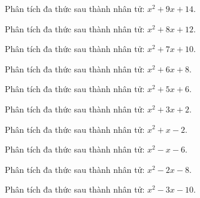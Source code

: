 \begin{bt}
	Phân tích đa thức sau thành nhân tử: $x^2 + 9 x + 14$.
\end{bt}
\begin{bt}
	Phân tích đa thức sau thành nhân tử: $x^2 + 8 x + 12$.
\end{bt}
\begin{bt}
	Phân tích đa thức sau thành nhân tử: $x^2 + 7 x + 10$.
\end{bt}
\begin{bt}
	Phân tích đa thức sau thành nhân tử: $x^2 + 6 x + 8$.
\end{bt}
\begin{bt}
	Phân tích đa thức sau thành nhân tử: $x^2 + 5 x + 6$.
\end{bt}
\begin{bt}
	Phân tích đa thức sau thành nhân tử: $x^2 + 3 x + 2$.
\end{bt}
\begin{bt}
	Phân tích đa thức sau thành nhân tử: $x^2 + x - 2$.
\end{bt}
\begin{bt}
	Phân tích đa thức sau thành nhân tử: $x^2 - x - 6$.
\end{bt}
\begin{bt}
	Phân tích đa thức sau thành nhân tử: $x^2 - 2 x - 8$.
\end{bt}
\begin{bt}
	Phân tích đa thức sau thành nhân tử: $x^2 - 3 x - 10$.
\end{bt}
